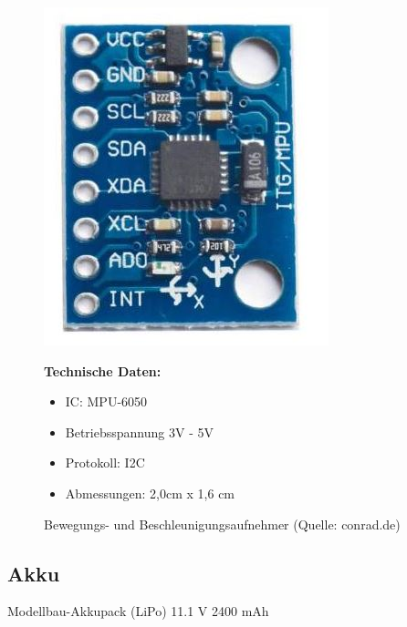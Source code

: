\begin{figure}[htb]
	\centering
	\begin{minipage}{0.49\linewidth}
		\centering
		\includegraphics[scale=0.5]{images/bew.jpg}
		\caption{Bewegungs- und Beschleunigungsaufnehmer \newline (Quelle: conrad.de)}
	\end{minipage}
	\begin{minipage}{0.4\linewidth}
		\textbf{Technische Daten:} 
		\begin{itemize} 
			\item IC: MPU-6050
			\item Betriebsspannung 3V - 5V
			\item Protokoll: I2C
			\item Abmessungen: 2,0cm x 1,6 cm
		\end{itemize}
	\end{minipage}
\end{figure}
\pagebreak

\subsection{Akku}

Modellbau-Akkupack (LiPo) 11.1 V 2400 mAh 

